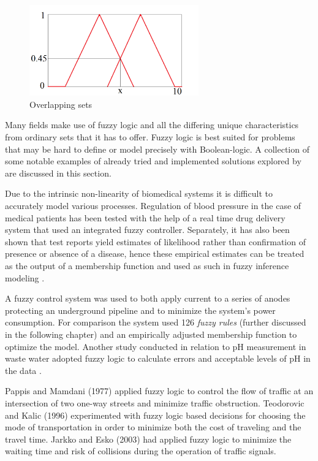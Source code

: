 \begin{figure}[!h]
\centering
	\includegraphics[width=0.65\textwidth]{images/overlap}
 	\caption{Overlapping sets}
 	\label{fig:overlapping}
\end{figure}

Many fields make use of fuzzy logic and all the differing unique characteristics from ordinary sets that it has to offer. Fuzzy logic is best suited for problems that may be hard to define or model precisely with Boolean-logic. A collection of some notable examples of already tried and implemented solutions explored by \cite{makkar2018} are discussed in this section.

Due to the intrinsic non-linearity of biomedical systems it is difficult to accurately model various processes. Regulation of blood pressure in the case of medical patients has been tested with the help of a real time drug delivery system that used an integrated fuzzy controller. Separately, it has also been shown that test reports yield estimates of likelihood rather than confirmation of presence or absence of a disease, hence these empirical estimates can be treated as the output of a membership function and used as such in fuzzy inference modeling \cite{hayward2003}.

A fuzzy control system was used to both apply current to a series of anodes protecting an underground pipeline and to minimize the system's power consumption. For comparison the system used 126 \textit{fuzzy rules} (further discussed in the following chapter) and an empirically adjusted membership function to optimize the model. Another study conducted in relation to pH measurement in waste water adopted fuzzy logic to calculate errors and acceptable levels of pH in the data \cite{hayward2003}. 

Pappis and Mamdani (1977) \cite{pappis1977} applied fuzzy logic to control the flow of traffic at an intersection of two one-way streets and minimize traffic obstruction. Teodorovic and Kalic (1996) \cite{kalic1996} experimented with fuzzy logic based decisions for choosing the mode of transportation in order to minimize both the cost of traveling and the travel time. Jarkko and Esko (2003) \cite{esko2003} had applied fuzzy logic to minimize the waiting time and risk of collisions during the operation of traffic signals.

